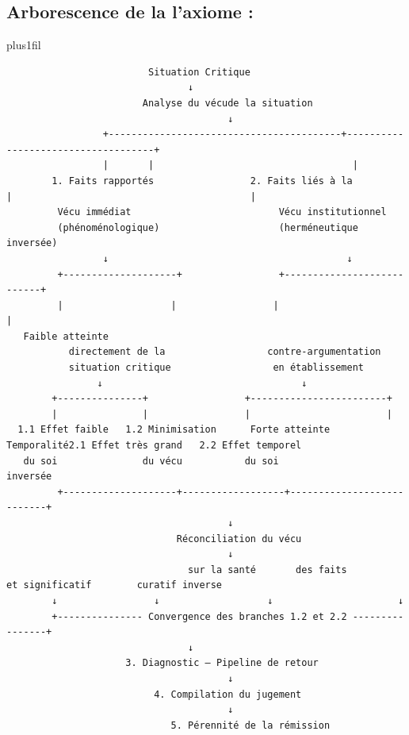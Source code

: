 \documentclass[12pt,letterpaper,oneside]{article}
\begin{document}
\subsection*{Arborescence de la l’axiome :}
\begingroup
\renewcommand{\verbatim@font}{\normalfont\ttfamily\fontsize{6.5}{7.5}\selectfont}%
\leftskip=2pt
\rightskip=0pt plus1fil
\begin{verbatim}
                         Situation Critique
                                ↓
                        Analyse du vécude la situation
                                       ↓
                 +-----------------------------------------+------------------------------------+
                 |       |                                   |
        1. Faits rapportés                 2. Faits liés à la                 |                                          |
         Vécu immédiat                          Vécu institutionnel
         (phénoménologique)                     (herméneutique inversée)
                 ↓                                          ↓
         +--------------------+                 +---------------------------+
         |                   |                 |                          |
   Faible atteinte
           directement de la                  contre‑argumentation
           situation critique                  en établissement
                ↓                                   ↓
        +---------------+                 +------------------------+
        |               |                 |                        |
  1.1 Effet faible   1.2 Minimisation      Forte atteinte           Temporalité2.1 Effet très grand   2.2 Effet temporel
   du soi               du vécu           du soi                   inversée
         +--------------------+------------------+---------------------------+
                                       ↓
                              Réconciliation du vécu
                                       ↓
                                sur la santé       des faits           et significatif        curatif inverse
        ↓                 ↓                   ↓                      ↓
        +--------------- Convergence des branches 1.2 et 2.2 ----------------+
                                ↓
                     3. Diagnostic — Pipeline de retour
                                       ↓
                          4. Compilation du jugement
                                       ↓
                             5. Pérennité de la rémission
\end{verbatim}
\endgroup
\end{document}
